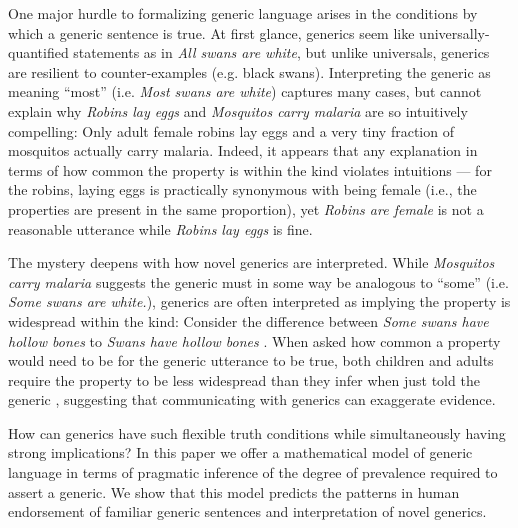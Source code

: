 \documentclass{pnastwo}
\begin{document}
\begin{article}
One major hurdle to formalizing generic language arises in the conditions by which a generic sentence is true.
At first glance, generics seem like universally-quantified statements as in \emph{All swans are white}, but unlike universals, generics are resilient to counter-examples (e.g. black swans). 
Interpreting the generic as meaning ``most'' (i.e. \emph{Most swans are white}) captures many cases, but cannot explain why \emph{Robins lay eggs} and \emph{Mosquitos carry malaria} are so intuitively compelling: Only adult female robins lay eggs and a very tiny fraction of mosquitos actually carry malaria.
Indeed, it appears that any explanation in terms of how common the property is within the kind violates intuitions --- for the robins, laying eggs is practically synonymous with being female (i.e., the properties are present in the same proportion), yet \emph{Robins are female} is not a reasonable utterance while \emph{Robins lay eggs} is fine.


The mystery deepens with how novel generics are interpreted.
While \emph{Mosquitos carry malaria} suggests the generic must in some way be analogous to ``some'' (i.e. \emph{Some swans are white.}), generics are often interpreted as implying the property is widespread within the kind:
Consider the difference between \emph{Some swans have hollow bones} to \emph{Swans have hollow bones} \cite{Gelman2002}.
When asked how common a property would need to be for the generic utterance to be true, both children and adults require the property to be less widespread than they infer when just told the generic \cite{Cimpian2010,Brandone2014}, suggesting that communicating with generics can exaggerate evidence.

How can generics have such flexible truth conditions while simultaneously having strong implications?
In this paper we offer a mathematical model of generic language in terms of pragmatic inference of the degree of prevalence required to assert a generic.  
We show that this model predicts the patterns in human endorsement of familiar generic sentences and interpretation of novel generics. 


\end{article}
\end{document}
